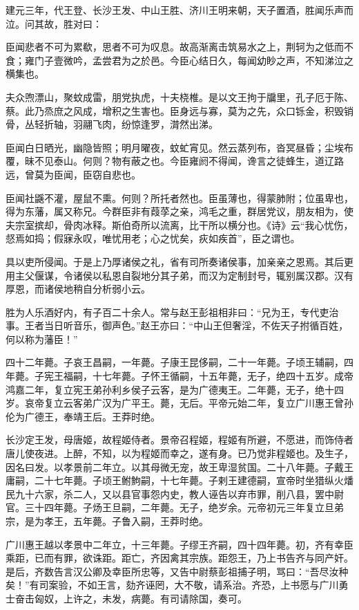 \documentclass[]{article}
\begin{document}
建元三年，代王登、长沙王发、中山王胜、济川王明来朝，天子置酒，胜闻乐声而泣。问其故，胜对曰：

臣闻悲者不可为累欷，思者不可为叹息。故高渐离击筑易水之上，荆轲为之低而不食；雍门子壹微吟，孟尝君为之於邑。今臣心结日久，每闻幼眇之声，不知涕泣之横集也。

夫众喣漂山，聚蚊成雷，朋党执虎，十夫桡椎。是以文王拘于牖里，孔子厄于陈、蔡。此乃烝庶之风成，增积之生害也。臣身远与寡，莫为之先，众口铄金，积毁销骨，丛轻折轴，羽翮飞肉，纷惊逢罗，潸然出涕。

臣闻白日晒光，幽隐皆照；明月曜夜，蚊虻宵见。然云蒸列布，沓冥昼昏；尘埃布覆，昧不见泰山。何则？物有蔽之也。今臣雍阏不得闻，谗言之徒蜂生，道辽路远，曾莫为臣闻，臣窃自悲也。

臣闻社鼷不灌，屋鼠不熏。何则？所托者然也。臣虽薄也，得蒙肺附；位虽卑也，得为东藩，属又称兄。今群臣非有葭莩之亲，鸿毛之重，群居党议，朋友相为，使夫宗室摈却，骨肉冰释。斯伯奇所以流离，比干所以横分也。《诗》云``我心忧伤，惄焉如捣；假寐永叹，唯忧用老；心之忧矣，疢如疾首''，臣之谓也。

具以吏所侵闻。于是上乃厚诸侯之礼，省有司所奏诸侯事，加亲亲之恩焉。其后更用主父偃谋，令诸侯以私恩自裂地分其子弟，而汉为定制封号，辄别属汉郡。汉有厚恩，而诸侯地稍自分析弱小云。

胜为人乐酒好内，有子百二十余人。常与赵王彭祖相非曰：``兄为王，专代吏治事。王者当日听音乐，御声色。''赵王亦曰：``中山王但奢淫，不佐天子拊循百姓，何以称为藩臣！''

四十二年薨。子哀王昌嗣，一年薨。子康王昆侈嗣，二十一年薨。子顷王辅嗣，四年薨。子宪王福嗣，十七年薨。子怀王循嗣，十五年薨，无子，绝四十五岁。成帝鸿嘉二年，复立宪王弟孙利乡侯子云客，是为广德夷王。二年薨，无子，绝十四岁。哀帝复立云客弟广汉为广平王。薨，无后。平帝元始二年，复立广川惠王曾孙伦为广德王，奉靖王后。王莽时绝。

长沙定王发，母唐姬，故程姬侍者。景帝召程姬，程姬有所避，不愿进，而饰侍者唐儿使夜进。上醉，不知，以为程姬而幸之，遂有身。已乃觉非程姬也。及生子，因名曰发。以孝景前二年立。以其母微无宠，故王卑湿贫国。二十八年薨。子戴王庸嗣，二十七年薨。子顷王鲋鮈嗣，十七年薨。子剌王建德嗣，宣帝时坐猎纵火燔民九十六家，杀二人，又以县官事怨内史，教人诬告以弃市罪，削八县，罢中尉官。三十四年薨。子炀王旦嗣，二年薨。无子，绝岁余。元帝初元三年复立旦弟宗，是为孝王，五年薨。子鲁入嗣，王莽时绝。

广川惠王越以孝景中二年立，十三年薨。子缪王齐嗣，四十四年薨。初，齐有幸臣乘距，已而有罪，欲诛距。距亡，齐因禽其宗族。距怨王，乃上书告齐与同产奸。是后，齐数告言汉公卿及幸臣所忠等，又告中尉蔡彭祖捕子明，骂曰：``吾尽汝种矣！''有司案验，不如王言，劾齐诬罔，大不敬，请系治。齐恐，上书愿与广川勇士奋击匈奴，上许之，未发，病薨。有司请除国，奏可。
\end{document}
